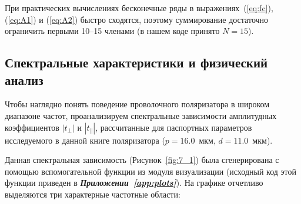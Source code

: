 При практических вычислениях бесконечные ряды в выражениях~(\ref{eq:fc}), (\ref{eq:A1}) и (\ref{eq:A2}) быстро сходятся, поэтому суммирование достаточно ограничить первыми 10--15 членами (в нашем коде принято $N=15$).


\subsection{Спектральные характеристики и физический анализ}

Чтобы наглядно понять поведение проволочного поляризатора в широком диапазоне частот, проанализируем спектральные зависимости амплитудных коэффициентов $|t_\perp|$ и $|t_\parallel|$, рассчитанные для паспортных параметров исследуемого в данной книге поляризатора ($p = 16.0$~мкм, $d = 11.0$~мкм).


Данная спектральная зависимость (Рисунок~\ref{fig:7_1}) была сгенерирована с помощью вспомогательной функции  из модуля визуализации  (исходный код этой функции приведен в \textbf{\textit{Приложении~\ref{app:plots}}}). На графике отчетливо выделяются три характерные частотные области:

